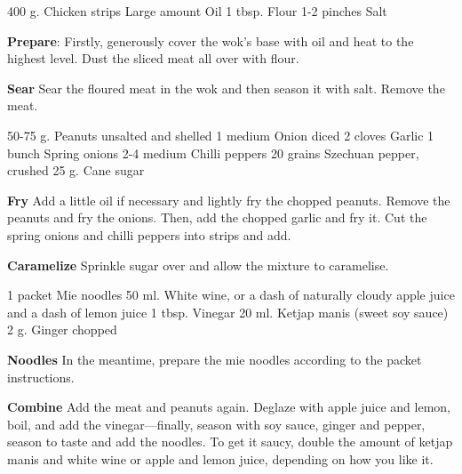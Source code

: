 \documentclass{article}
\begin{document}

\dishType{\maindish}
\dishOther{\meat}

\begin{step}
400 g. Chicken strips
Large amount Oil
1 tbsp. Flour
1-2 pinches Salt

\method
\textbf{Prepare}: Firstly, generously cover the wok's base with oil and heat to the highest level. Dust the sliced meat all over with flour.

\textbf{Sear} Sear the floured meat in the wok and then season it with salt. Remove the meat.
\end{step}

\begin{step}
50-75 g. Peanuts unsalted and shelled
1 medium Onion diced
2 cloves Garlic
1 bunch Spring onions
2-4 medium Chilli peppers
20 grains Szechuan pepper, crushed
25 g. Cane sugar

\method
\textbf{Fry} Add a little oil if necessary and lightly fry the chopped peanuts. Remove the peanuts and fry the onions. Then, add the chopped garlic and fry it. Cut the spring onions and chilli peppers into strips and add.

\textbf{Caramelize} Sprinkle sugar over and allow the mixture to caramelise.
\end{step}

\begin{step}
1 packet Mie noodles
50 ml. White wine,  or a dash of naturally cloudy apple juice and a dash of lemon juice
1 tbsp. Vinegar
20 ml. Ketjap manis (sweet soy sauce)
2 g. Ginger chopped

\method
\textbf{Noodles} In the meantime, prepare the mie noodles according to the packet instructions.

\textbf{Combine} Add the meat and peanuts again. Deglaze with apple juice and lemon, boil, and add the vinegar—finally, season with soy sauce, ginger and pepper, season to taste and add the noodles. To get it saucy, double the amount of ketjap manis and white wine or apple and lemon juice, depending on how you like it.
\end{step}


\end{document}
